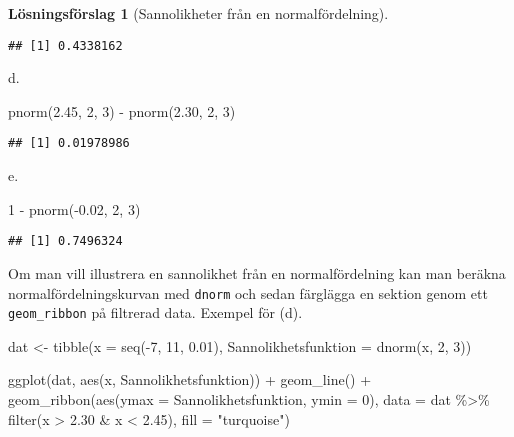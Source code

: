 \documentclass[
]{book}
\newenvironment{Shaded}{\begin{snugshade}}{\end{snugshade}}
\newcommand{\AttributeTok}[1]{\textcolor[rgb]{0.77,0.63,0.00}{#1}}
\newcommand{\DecValTok}[1]{\textcolor[rgb]{0.00,0.00,0.81}{#1}}
\newcommand{\FloatTok}[1]{\textcolor[rgb]{0.00,0.00,0.81}{#1}}
\newcommand{\FunctionTok}[1]{\textcolor[rgb]{0.00,0.00,0.00}{#1}}
\newcommand{\NormalTok}[1]{#1}
\newcommand{\OtherTok}[1]{\textcolor[rgb]{0.56,0.35,0.01}{#1}}
\newcommand{\SpecialCharTok}[1]{\textcolor[rgb]{0.00,0.00,0.00}{#1}}
\newcommand{\StringTok}[1]{\textcolor[rgb]{0.31,0.60,0.02}{#1}}
\theoremstyle{definition}
\theoremstyle{definition}
\theoremstyle{definition}
\theoremstyle{definition}
\newtheorem{hypothesis}{Lösningsförslag}[chapter]
\theoremstyle{remark}
\begin{document}
\begin{hypothesis}[Sannolikheter från en normalfördelning]
\begin{verbatim}
## [1] 0.4338162
\end{verbatim}

d.

\begin{Shaded}
\begin{Highlighting}[]
\FunctionTok{pnorm}\NormalTok{(}\FloatTok{2.45}\NormalTok{, }\DecValTok{2}\NormalTok{, }\DecValTok{3}\NormalTok{) }\SpecialCharTok{{-}} \FunctionTok{pnorm}\NormalTok{(}\FloatTok{2.30}\NormalTok{, }\DecValTok{2}\NormalTok{, }\DecValTok{3}\NormalTok{)}
\end{Highlighting}
\end{Shaded}

\begin{verbatim}
## [1] 0.01978986
\end{verbatim}

e.

\begin{Shaded}
\begin{Highlighting}[]
\DecValTok{1} \SpecialCharTok{{-}} \FunctionTok{pnorm}\NormalTok{(}\SpecialCharTok{{-}}\FloatTok{0.02}\NormalTok{, }\DecValTok{2}\NormalTok{, }\DecValTok{3}\NormalTok{)}
\end{Highlighting}
\end{Shaded}

\begin{verbatim}
## [1] 0.7496324
\end{verbatim}

Om man vill illustrera en sannolikhet från en normalfördelning kan man beräkna normalfördelningskurvan med \texttt{dnorm} och sedan färglägga en sektion genom ett \texttt{geom\_ribbon} på filtrerad data. Exempel för (d).

\begin{Shaded}
\begin{Highlighting}[]
\NormalTok{dat }\OtherTok{\textless{}{-}} \FunctionTok{tibble}\NormalTok{(}\AttributeTok{x =} \FunctionTok{seq}\NormalTok{(}\SpecialCharTok{{-}}\DecValTok{7}\NormalTok{, }\DecValTok{11}\NormalTok{, }\FloatTok{0.01}\NormalTok{),}
              \AttributeTok{Sannolikhetsfunktion =} \FunctionTok{dnorm}\NormalTok{(x, }\DecValTok{2}\NormalTok{, }\DecValTok{3}\NormalTok{))}

\FunctionTok{ggplot}\NormalTok{(dat, }\FunctionTok{aes}\NormalTok{(x, Sannolikhetsfunktion)) }\SpecialCharTok{+}
  \FunctionTok{geom\_line}\NormalTok{() }\SpecialCharTok{+}
  \FunctionTok{geom\_ribbon}\NormalTok{(}\FunctionTok{aes}\NormalTok{(}\AttributeTok{ymax =}\NormalTok{ Sannolikhetsfunktion, }\AttributeTok{ymin =} \DecValTok{0}\NormalTok{), }
              \AttributeTok{data =}\NormalTok{ dat }\SpecialCharTok{\%\textgreater{}\%} \FunctionTok{filter}\NormalTok{(x }\SpecialCharTok{\textgreater{}} \FloatTok{2.30} \SpecialCharTok{\&}\NormalTok{ x }\SpecialCharTok{\textless{}} \FloatTok{2.45}\NormalTok{),}
              \AttributeTok{fill =} \StringTok{"turquoise"}\NormalTok{)}
\end{Highlighting}
\end{Shaded}


\end{hypothesis}
\end{document}
